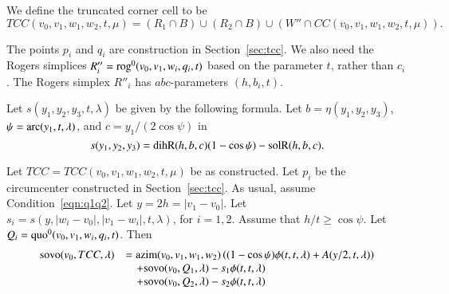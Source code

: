\begin{definition} We define the truncated corner cell
to be
$$
TCC(v_0,v_1,w_1,w_2,t,\mu) =
(R_1\cap B)\cup (R_2\cap B) \cup (W''\cap CC(v_0,v_1,w_1,w_2,t,\mu)).
$$
\end{definition}

The points $p_i$ and
 $q_i$ are construction in Section~\ref{sec:tcc}.
We also need the Rogers simplices 
$R''_i= {\operatorname{rog}}^0(v_0,v_1,w_i,q_i,t)$ based on the parameter
$t$, rather than $c_i$.  The Rogers simplex $R''_i$
has $abc$-parameters
$(h,b_i,t)$.  

Let $s(y_1,y_2,y_3,t,\lambda)$ be given by the following formula.
Let $b = \eta(y_1,y_2,y_3)$, $\psi = \operatorname{arc}(y_1,t,\lambda)$,
and $c = y_1/(2\cos\psi)$ in
  $$
  s(y_1,y_2,y_3) = {\operatorname{dihR}}(h,b,c) (1-\cos\psi) - {\operatorname{solR}}(h,b,c).
  $$


\begin{lemma}\label{lemma:tcc}  
Let $TCC=TCC(v_0,v_1,w_1,w_2,t,\mu)$ be as constructed.
Let $p_i$ be the circumcenter constructed in Section~\ref{sec:tcc}.
As usual, assume Condition~\ref{eqn:q1q2}.  
Let $y = 2h = |v_1-v_0|$.  
Let $s_i = s(y,|w_i-v_0|,|v_1-w_i|,t,\lambda)$, for $i=1,2$.
Assume that
$h/t \ge \cos\psi$.  
Let $Q_i = {\operatorname{quo}}^0(v_0,v_1,w_i,q_i,t)$.  Then
  \begin{equation}\label{eqn:tcc}
  \begin{array}{lll}
  {\operatorname{sovo}}(v_0,TCC,\lambda) &= 
  {\operatorname{azim}}(v_0,v_1,w_1,w_2) \left((1-\cos\psi)\phi(t,t,\lambda)+
    A(y/2,t,\lambda)\right) \\
    &\quad + {\operatorname{sovo}}(v_0,Q_1,\lambda) - s_1\phi(t,t,\lambda) \\
    &\quad + {\operatorname{sovo}}(v_0,Q_2,\lambda) - s_2\phi(t,t,\lambda) \\
  \end{array}
  \end{equation}
\end{lemma}

